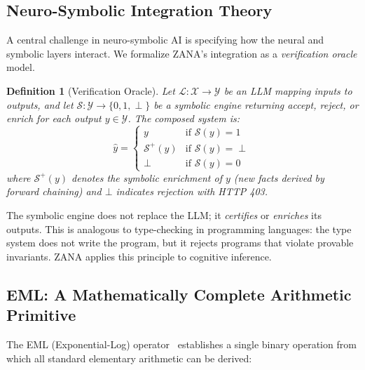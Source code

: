 \documentclass[12pt,a4paper]{article}
\newtheorem{definition}{Definition}[section]
\begin{document}
\subsection{Neuro-Symbolic Integration Theory}

A central challenge in neuro-symbolic AI is specifying how the neural and symbolic layers
interact. We formalize ZANA's integration as a \emph{verification oracle} model.

\begin{definition}[Verification Oracle]
Let $\mathcal{L}: \mathcal{X} \to \mathcal{Y}$ be an LLM mapping inputs to outputs, and let
$\mathcal{S}: \mathcal{Y} \to \{0, 1, \perp\}$ be a symbolic engine returning
\textsf{accept}, \textsf{reject}, or \textsf{enrich} for each output $y \in \mathcal{Y}$.
The composed system is:
\begin{equation}
  \hat{y} = \begin{cases}
    y & \text{if } \mathcal{S}(y) = 1 \\
    \mathcal{S}^+(y) & \text{if } \mathcal{S}(y) = \perp \\
    \bot & \text{if } \mathcal{S}(y) = 0
  \end{cases}
\end{equation}
where $\mathcal{S}^+(y)$ denotes the symbolic enrichment of $y$ (new facts derived by
forward chaining) and $\bot$ indicates rejection with HTTP 403.
\end{definition}

\begin{tcolorbox}[insight]
The symbolic engine does not replace the LLM; it \emph{certifies} or \emph{enriches} its
outputs. This is analogous to type-checking in programming languages: the type system does
not write the program, but it rejects programs that violate provable invariants. ZANA applies
this principle to cognitive inference.
\end{tcolorbox}

\subsection{EML: A Mathematically Complete Arithmetic Primitive}

The EML (Exponential-Log) operator~\cite{odrzywolekEML} establishes a single binary operation
from which all standard elementary arithmetic can be derived:
\end{document}
